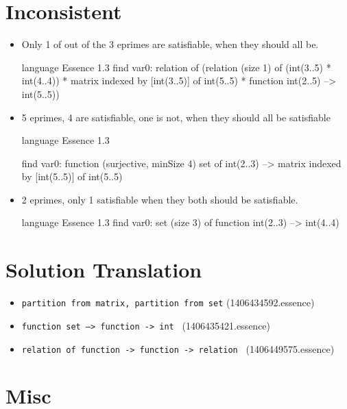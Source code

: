 \section{Inconsistent}
\begin{itemize}
	\item Only 1 of out of the 3 eprimes are satisfiable, when they should all be. 
	\begin{lst:essence}[breaklines=true,caption=1406438642.essence]
	language Essence 1.3
	find var0:
	        relation of
	            (relation (size 1) of (int(3..5) * int(4..4)) *
	             matrix indexed by [int(3..5)] of int(5..5) * function int(2..5) --> int(5..5))
	\end{lst:essence}

	\item 5 eprimes, 4 are satisfiable, one is not, when they should all be satisfiable
	\begin{lst:essence}[breaklines=true,caption=1406470083.essence]
	language Essence 1.3

	find var0:
	        function (surjective, minSize 4)
	            set of int(2..3) --> matrix indexed by [int(5..5)] of int(5..5)
	\end{lst:essence}

	\item  2 eprimes, only 1 satisfiable when they both should be satisfiable.
	\begin{lst:essence}[breaklines=true,caption=1406470239.essence]
	language Essence 1.3
	find var0: set (size 3) of function int(2..3) --> int(4..4)
	\end{lst:essence}
	
	
\end{itemize}

\section{Solution Translation}

\begin{itemize}
	\item \texttt{partition from matrix, partition from set} (1406434592.essence)
	\item \texttt{function set --> function -> int } (1406435421.essence)
	\item \texttt{relation of  function -> function -> relation } (1406449575.essence)
\end{itemize} 


\section{Misc}

